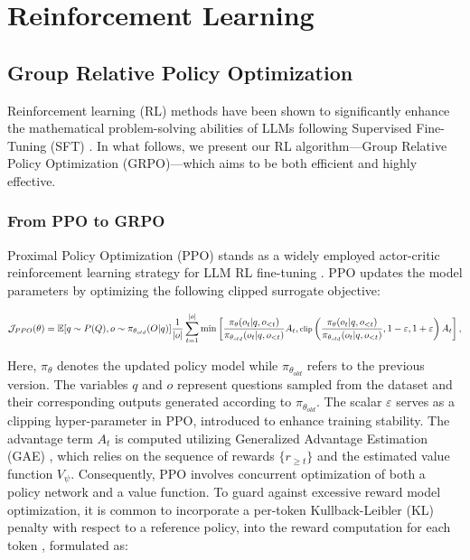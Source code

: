 \section{Reinforcement Learning}

\subsection{Group Relative Policy Optimization} Reinforcement learning (RL) methods have been shown to significantly enhance the mathematical problem-solving abilities of LLMs following Supervised Fine-Tuning (SFT) \citep{wang2023math,wizardmath}. In what follows, we present our RL algorithm—Group Relative Policy Optimization (GRPO)—which aims to be both efficient and highly effective.

\subsubsection{From PPO to GRPO} Proximal Policy Optimization (PPO) \citep{schulman2017proximal} stands as a widely employed actor-critic reinforcement learning strategy for LLM RL fine-tuning \citep{ouyang2022training}. PPO updates the model parameters by optimizing the following clipped surrogate objective:

\begin{equation}
\footnotesize
    \mathcal{J}_{PPO}(\theta) = \mathbb{E}{[q \sim P(Q), o \sim \pi_{\theta_{old}}(O|q)]} \frac{1}{|o|} \sum_{t=1}^{|o|} \min \left[ \frac{\pi_\theta(o_{t} | q, o_{<t})}{\pi_{\theta_{old}}(o_{t} | q, o_{<t})} A_{t}, \text{clip} \left( \frac{\pi_\theta(o_{t} | q, o_{<t})}{\pi_{\theta_{old}}(o_{t} | q, o_{<t})}, 1 - \varepsilon, 1 + \varepsilon \right)  A_{t} \right] ,
\end{equation}

Here, $\pi_{\theta}$ denotes the updated policy model while $\pi_{\theta_{old}}$ refers to the previous version. The variables $q$ and $o$ represent questions sampled from the dataset and their corresponding outputs generated according to $\pi_{\theta_{old}}$. The scalar $\varepsilon$ serves as a clipping hyper-parameter in PPO, introduced to enhance training stability. The advantage term $A_t$ is computed utilizing Generalized Advantage Estimation (GAE) \citep{gae}, which relies on the sequence of rewards $\{r_{\ge t}\}$ and the estimated value function $V_{\psi}$. Consequently, PPO involves concurrent optimization of both a policy network and a value function. To guard against excessive reward model optimization, it is common to incorporate a per-token Kullback-Leibler (KL) penalty with respect to a reference policy, into the reward computation for each token \citep{ouyang2022training}, formulated as:

